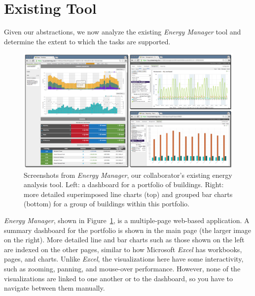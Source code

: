 \documentclass[journal]{vgtc}                %
\begin{document}

\section{Existing Tool}
\label{existing-tool}


Given our abstractions, we now analyze the existing {\it Energy Manager} tool and determine the extent to which the tasks are supported.

\begin{figure}[bp!]
    \vspace{-0.6cm}
	\centering
	\includegraphics[width=\textwidth]{figures/em.pdf}
	\vspace{-0.6cm}
	\caption{Screenshots from \textsl{Energy Manager}, our collaborator's existing energy analysis tool. Left: a dashboard for a portfolio of buildings. Right: more detailed superimposed line charts (top) and grouped bar charts (bottom) for a group of buildings within this portfolio.}
	\label{fig:energy-manager}
\end{figure} 


{\it Energy Manager}, shown in Figure~\ref{fig:energy-manager}, is a multiple-page web-based application.
A summary dashboard for the portfolio is shown in the main page (the larger image on the right). 
More detailed line and bar charts such as those shown on the left are indexed on the other pages, similar to how Microsoft {\it Excel} has workbooks, pages, and charts. 
Unlike {\it Excel}, the visualizations here have some interactivity, such as zooming, panning, and mouse-over performance. 
However, none of the visualizations are linked to one another or to the dashboard, so you have to navigate between them manually.
\end{document}
